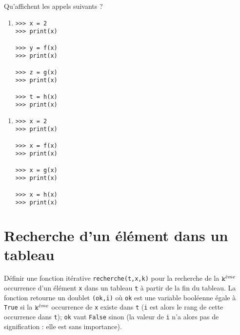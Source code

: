 \documentclass[11pt,a4paper]{article}
\begin{document}
Qu'affichent les appels suivants ?
\vspace*{2mm}

\begin{minipage}{7cm}
\begin{enumerate}
\item 

\begin{py}{3cm}
\begin{verbatim}
>>> x = 2
>>> print(x)

>>> y = f(x)
>>> print(x)

>>> z = g(x)
>>> print(x)

>>> t = h(x)
>>> print(x)
\end{verbatim}
\end{py}

\framebox[5.5cm]{$\rule{0cm}{13cm}$}
\end{enumerate}
\end{minipage}
\hfill
\begin{minipage}{7cm}
\begin{enumerate}

\item

\begin{py}{4cm}
\begin{verbatim}
>>> x = 2
>>> print(x)

>>> x = f(x)
>>> print(x)

>>> x = g(x)
>>> print(x)

>>> x = h(x)
>>> print(x)
\end{verbatim}
\end{py}

\framebox[5.5cm]{$\rule{0cm}{13cm}$}

\end{enumerate}
\end{minipage}

\section{Recherche d'un élément dans un tableau}
Définir une fonction itérative {\tt recherche(t,x,k)} pour la recherche de la 
$\mbox{\tt k}^{\grave eme}$ 
occurrence d'un élément {\tt x} dans un tableau {\tt t} à partir de la fin du
tableau. La fonction retourne
un doublet {\tt (ok,i)} où {\tt ok} est une variable booléenne égale à 
{\tt True} si la $\mbox{\tt k}^{\grave eme}$ occurrence de {\tt x} existe dans 
{\tt t} ({\tt i} est alors le rang de cette occurrence dans {\tt t}); {\tt ok}
vaut {\tt False} sinon (la valeur de {\tt i} n'a alors pas de signification :
elle est sans importance).
\end{document}
